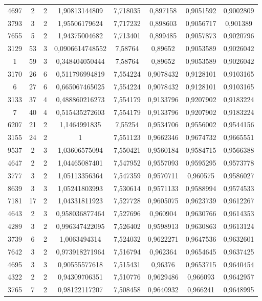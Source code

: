 \begin{longtable}{|c|c|c|c|c|c|c|c|}
4697 & 2 & 2 & 1,90813144809 & 7,718035 & 0,897158 & 0,9051592 & 0,9002809 \\
3793 & 3 & 2 & 1,95506179624 & 7,717232 & 0,898603 & 0,9056717 & 0,901389 \\
7655 & 5 & 2 & 1,94375004682 & 7,713401 & 0,899485 & 0,9057873 & 0,9020796 \\
3129 & 53 & 3 & 0,0906614748552 & 7,58764 & 0,89652 & 0,9053589 & 0,9026042 \\
1 & 59 & 3 & 0,348404050444 & 7,58764 & 0,89652 & 0,9053589 & 0,9026042 \\
3170 & 26 & 6 & 0,511796994819 & 7,554224 & 0,9078432 & 0,9128101 & 0,9103165 \\
6 & 27 & 6 & 0,665067465025 & 7,554224 & 0,9078432 & 0,9128101 & 0,9103165 \\
3133 & 37 & 4 & 0,488860216273 & 7,554179 & 0,9133796 & 0,9207902 & 0,9183224 \\
7 & 40 & 4 & 0,515435272603 & 7,554179 & 0,9133796 & 0,9207902 & 0,9183224 \\
6207 & 21 & 2 & 1,1464991835 & 7,55254 & 0,9534706 & 0,9556002 & 0,9544156 \\
3155 & 24 & 2 & 1 & 7,551123 & 0,9662346 & 0,9674732 & 0,9665551 \\
9537 & 2 & 3 & 1,03606575094 & 7,550421 & 0,9560184 & 0,9584715 & 0,9566388 \\
4647 & 2 & 2 & 1,04465087401 & 7,547952 & 0,9557093 & 0,9595295 & 0,9573778 \\
3777 & 3 & 2 & 1,05113356364 & 7,547359 & 0,9570711 & 0,960575 & 0,9586027 \\
8639 & 3 & 3 & 1,05241803993 & 7,530614 & 0,9571133 & 0,9588994 & 0,9574533 \\
7181 & 17 & 2 & 1,04331811923 & 7,527728 & 0,9605075 & 0,9623739 & 0,9612267 \\
4643 & 2 & 3 & 0,958036877464 & 7,527696 & 0,960904 & 0,9630766 & 0,9614353 \\
4289 & 3 & 2 & 0,996347422095 & 7,526402 & 0,9598913 & 0,9630863 & 0,9613124 \\
3739 & 6 & 2 & 1,0063494314 & 7,524032 & 0,9622271 & 0,9647536 & 0,9632601 \\
7642 & 3 & 2 & 0,973918271964 & 7,516794 & 0,962364 & 0,9654645 & 0,9637425 \\
4695 & 3 & 3 & 0,90555577618 & 7,515431 & 0,96376 & 0,9653715 & 0,9640454 \\
4322 & 2 & 2 & 0,94309706351 & 7,510776 & 0,9629486 & 0,966093 & 0,9642957 \\
3765 & 7 & 2 & 0,98122117207 & 7,508458 & 0,9640932 & 0,966241 & 0,9648995 \\

\end{longtable}
